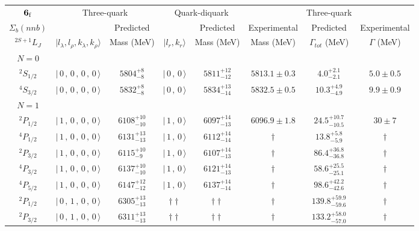 \begin{tabular}{c| c c c c c c c}\hline \hline
${\bf {6}}_{\rm f}$ & \multicolumn{2}{c}{Three-quark} &  \multicolumn{2}{c}{Quark-diquark}   &    &  Three-quark  &\\ 
$\Sigma_{b}(nnb)$ &   & Predicted  &   &  Predicted   &  Experimental &  Predicted            & Experimental \\ 
 $^{2S+1}L_{J}$ & $\vert l_{\lambda}, l_{\rho}, k_{\lambda}, k_{\rho} \rangle$ & Mass (MeV)  & $\vert l_{r}, k_{r} \rangle$  &  Mass (MeV)   &  Mass (MeV)   &  $\Gamma_{tot}$ (MeV) & $\Gamma$ (MeV) \\ \hline
\hline
 $N=0$  &  &  &  &  &  \\ 
$^{2}S_{1/2}$ & $\vert \,0\,,\,0\,,\,0\,,\,0 \,\rangle $ & $5804^{+8}_{-8}$ & $\vert \,0\,,\,0 \,\rangle$ & $5811^{+12}_{-12}$ & $5813.1\pm 0.3$ & $4.0^{+2.1}_{-2.1}$ & $5.0\pm 0.5$ \\ 
$^{4}S_{3/2}$ & $\vert \,0\,,\,0\,,\,0\,,\,0 \,\rangle $ & $5832^{+8}_{-8}$ & $\vert \,0\,,\,0 \,\rangle$ & $5834^{+13}_{-14}$ & $5832.5\pm 0.5$ & $10.3^{+4.9}_{-4.9}$ & $9.9\pm 0.9$ \\ 
\hline
 $N=1$  &  &  &  &  &  \\ 
$^{2}P_{1/2}$ & $\vert \,1\,,\,0\,,\,0\,,\,0 \,\rangle $ & $6108^{+10}_{-10}$ & $\vert \,1\,,\,0 \,\rangle$ & $6097^{+14}_{-13}$ & $6096.9\pm 1.8$ & $24.5^{+10.7}_{-10.5}$ & $30\pm 7$ \\ 
$^{4}P_{1/2}$ & $\vert \,1\,,\,0\,,\,0\,,\,0 \,\rangle $ & $6131^{+13}_{-13}$ & $\vert \,1\,,\,0 \,\rangle$ & $6112^{+14}_{-14}$ & $\dagger$ & $13.8^{+5.8}_{-5.9}$ & $\dagger$ \\ 
$^{2}P_{3/2}$ & $\vert \,1\,,\,0\,,\,0\,,\,0 \,\rangle $ & $6115^{+10}_{-9}$ & $\vert \,1\,,\,0 \,\rangle$ & $6107^{+14}_{-13}$ & $\dagger$ & $86.4^{+36.8}_{-36.8}$ & $\dagger$ \\ 
$^{4}P_{3/2}$ & $\vert \,1\,,\,0\,,\,0\,,\,0 \,\rangle $ & $6137^{+10}_{-10}$ & $\vert \,1\,,\,0 \,\rangle$ & $6121^{+14}_{-13}$ & $\dagger$ & $58.6^{+25.5}_{-25.1}$ & $\dagger$ \\ 
$^{4}P_{5/2}$ & $\vert \,1\,,\,0\,,\,0\,,\,0 \,\rangle $ & $6147^{+12}_{-12}$ & $\vert \,1\,,\,0 \,\rangle$ & $6137^{+14}_{-14}$ & $\dagger$ & $98.6^{+42.2}_{-42.6}$ & $\dagger$ \\ 
$^{2}P_{1/2}$ & $\vert \,0\,,\,1\,,\,0\,,\,0 \,\rangle $ & $6305^{+13}_{-13}$ & $\dagger\dagger$ & $\dagger\dagger$ & $\dagger$ & $139.8^{+59.9}_{-59.6}$ & $\dagger$ \\ 
$^{2}P_{3/2}$ & $\vert \,0\,,\,1\,,\,0\,,\,0 \,\rangle $ & $6311^{+13}_{-13}$ & $\dagger\dagger$ & $\dagger\dagger$ & $\dagger$ & $133.2^{+58.0}_{-57.0}$ & $\dagger$ \\ 

\end{tabular}
